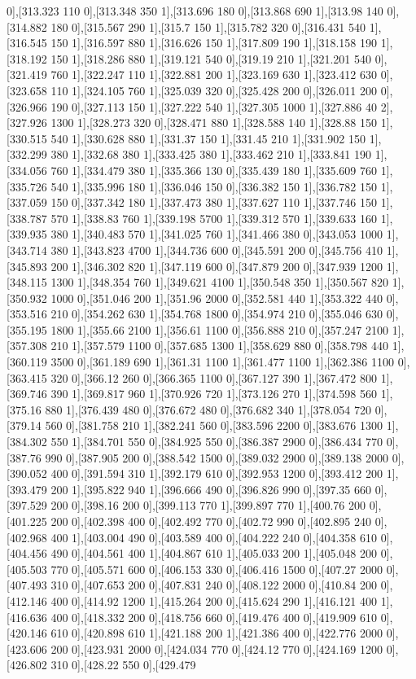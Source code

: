{0],[313.323 110 0],[313.348 350 1],[313.696 180 0],[313.868 690 1],[313.98 140 0],[314.882 180 0],[315.567 290 1],[315.7 150 1],[315.782 320 0],[316.431 540 1],[316.545 150 1],[316.597 880 1],[316.626 150 1],[317.809 190 1],[318.158 190 1],[318.192 150 1],[318.286 880 1],[319.121 540 0],[319.19 210 1],[321.201 540 0],[321.419 760 1],[322.247 110 1],[322.881 200 1],[323.169 630 1],[323.412 630 0],[323.658 110 1],[324.105 760 1],[325.039 320 0],[325.428 200 0],[326.011 200 0],[326.966 190 0],[327.113 150 1],[327.222 540 1],[327.305 1000 1],[327.886 40 2],[327.926 1300 1],[328.273 320 0],[328.471 880 1],[328.588 140 1],[328.88 150 1],[330.515 540 1],[330.628 880 1],[331.37 150 1],[331.45 210 1],[331.902 150 1],[332.299 380 1],[332.68 380 1],[333.425 380 1],[333.462 210 1],[333.841 190 1],[334.056 760 1],[334.479 380 1],[335.366 130 0],[335.439 180 1],[335.609 760 1],[335.726 540 1],[335.996 180 1],[336.046 150 0],[336.382 150 1],[336.782 150 1],[337.059 150 0],[337.342 180 1],[337.473 380 1],[337.627 110 1],[337.746 150 1],[338.787 570 1],[338.83 760 1],[339.198 5700 1],[339.312 570 1],[339.633 160 1],[339.935 380 1],[340.483 570 1],[341.025 760 1],[341.466 380 0],[343.053 1000 1],[343.714 380 1],[343.823 4700 1],[344.736 600 0],[345.591 200 0],[345.756 410 1],[345.893 200 1],[346.302 820 1],[347.119 600 0],[347.879 200 0],[347.939 1200 1],[348.115 1300 1],[348.354 760 1],[349.621 4100 1],[350.548 350 1],[350.567 820 1],[350.932 1000 0],[351.046 200 1],[351.96 2000 0],[352.581 440 1],[353.322 440 0],[353.516 210 0],[354.262 630 1],[354.768 1800 0],[354.974 210 0],[355.046 630 0],[355.195 1800 1],[355.66 2100 1],[356.61 1100 0],[356.888 210 0],[357.247 2100 1],[357.308 210 1],[357.579 1100 0],[357.685 1300 1],[358.629 880 0],[358.798 440 1],[360.119 3500 0],[361.189 690 1],[361.31 1100 1],[361.477 1100 1],[362.386 1100 0],[363.415 320 0],[366.12 260 0],[366.365 1100 0],[367.127 390 1],[367.472 800 1],[369.746 390 1],[369.817 960 1],[370.926 720 1],[373.126 270 1],[374.598 560 1],[375.16 880 1],[376.439 480 0],[376.672 480 0],[376.682 340 1],[378.054 720 0],[379.14 560 0],[381.758 210 1],[382.241 560 0],[383.596 2200 0],[383.676 1300 1],[384.302 550 1],[384.701 550 0],[384.925 550 0],[386.387 2900 0],[386.434 770 0],[387.76 990 0],[387.905 200 0],[388.542 1500 0],[389.032 2900 0],[389.138 2000 0],[390.052 400 0],[391.594 310 1],[392.179 610 0],[392.953 1200 0],[393.412 200 1],[393.479 200 1],[395.822 940 1],[396.666 490 0],[396.826 990 0],[397.35 660 0],[397.529 200 0],[398.16 200 0],[399.113 770 1],[399.897 770 1],[400.76 200 0],[401.225 200 0],[402.398 400 0],[402.492 770 0],[402.72 990 0],[402.895 240 0],[402.968 400 1],[403.004 490 0],[403.589 400 0],[404.222 240 0],[404.358 610 0],[404.456 490 0],[404.561 400 1],[404.867 610 1],[405.033 200 1],[405.048 200 0],[405.503 770 0],[405.571 600 0],[406.153 330 0],[406.416 1500 0],[407.27 2000 0],[407.493 310 0],[407.653 200 0],[407.831 240 0],[408.122 2000 0],[410.84 200 0],[412.146 400 0],[414.92 1200 1],[415.264 200 0],[415.624 290 1],[416.121 400 1],[416.636 400 0],[418.332 200 0],[418.756 660 0],[419.476 400 0],[419.909 610 0],[420.146 610 0],[420.898 610 1],[421.188 200 1],[421.386 400 0],[422.776 2000 0],[423.606 200 0],[423.931 2000 0],[424.034 770 0],[424.12 770 0],[424.169 1200 0],[426.802 310 0],[428.22 550 0],[429.479 }
